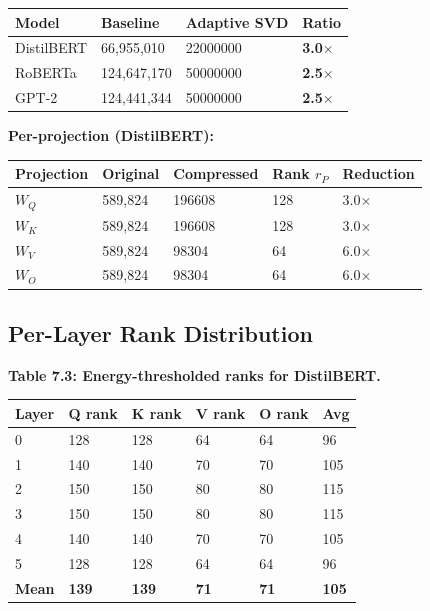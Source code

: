 \begin{table}[H]
\centering
\small
\begin{tabular}{llll}
\toprule
\textbf{Model} & \textbf{Baseline} & \textbf{Adaptive SVD} & \textbf{Ratio} \\
\midrule
DistilBERT & 66,955,010 & 22000000 & \textbf{3.0$\times$} \\
RoBERTa & 124,647,170 & 50000000 & \textbf{2.5$\times$} \\
GPT-2 & 124,441,344 & 50000000 & \textbf{2.5$\times$} \\
\bottomrule
\end{tabular}
\end{table}

\textbf{Per-projection (DistilBERT):}

\begin{table}[H]
\centering
\small
\begin{tabular}{lllll}
\toprule
\textbf{Projection} & \textbf{Original} & \textbf{Compressed} & \textbf{Rank $r_P$} & \textbf{Reduction} \\
\midrule
$W_Q$ & 589,824 & 196608 & 128 & 3.0$\times$ \\
$W_K$ & 589,824 & 196608 & 128 & 3.0$\times$ \\
$W_V$ & 589,824 & 98304 & 64 & 6.0$\times$ \\
$W_O$ & 589,824 & 98304 & 64 & 6.0$\times$ \\
\bottomrule
\end{tabular}
\end{table}

\subsection{Per-Layer Rank Distribution}

\textbf{Table 7.3: Energy-thresholded ranks for DistilBERT.}

\begin{table}[H]
\centering
\small
\begin{tabular}{llllll}
\toprule
\textbf{Layer} & \textbf{Q rank} & \textbf{K rank} & \textbf{V rank} & \textbf{O rank} & \textbf{Avg} \\
\midrule
0 & 128 & 128 & 64 & 64 & 96 \\
1 & 140 & 140 & 70 & 70 & 105 \\
2 & 150 & 150 & 80 & 80 & 115 \\
3 & 150 & 150 & 80 & 80 & 115 \\
4 & 140 & 140 & 70 & 70 & 105 \\
5 & 128 & 128 & 64 & 64 & 96 \\
\textbf{Mean} & \textbf{139} & \textbf{139} & \textbf{71} & \textbf{71} & \textbf{105} \\
\bottomrule
\end{tabular}
\end{table}

